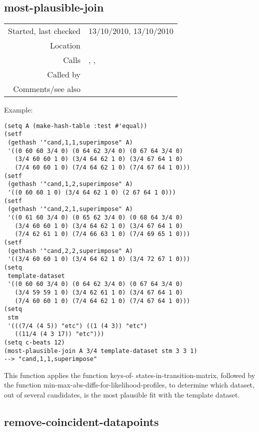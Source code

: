 \subsection*{most-plausible-join}\label{fun:most-plausible-join}

\vspace{0.3cm}
\begin{tabular}{r|p{8cm}}
Started, last checked & 13/10/2010, 13/10/2010 \\
Location & \nameref{sec:generating-beat-MNN-spacing-for-and-back} \\
Calls & \nameref{fun:disp-ht-key}, \nameref{fun:keys-of-states-in-transition-matrix},\newline \nameref{fun:min-max-abs-diffs-for-likelihood-profiles} \\
Called by & \\
Comments/see also &
\end{tabular}

\vspace{0.5cm}
\noindent Example:
\begin{verbatim}
(setq A (make-hash-table :test #'equal))
(setf
 (gethash '"cand,1,1,superimpose" A)
 '((0 60 60 3/4 0) (0 64 62 3/4 0) (0 67 64 3/4 0)
   (3/4 60 60 1 0) (3/4 64 62 1 0) (3/4 67 64 1 0)
   (7/4 60 60 1 0) (7/4 64 62 1 0) (7/4 67 64 1 0)))
(setf
 (gethash '"cand,1,2,superimpose" A)
 '((0 60 60 1 0) (3/4 64 62 1 0) (2 67 64 1 0)))
(setf
 (gethash '"cand,2,1,superimpose" A)
 '((0 61 60 3/4 0) (0 65 62 3/4 0) (0 68 64 3/4 0)
   (3/4 60 60 1 0) (3/4 64 62 1 0) (3/4 67 64 1 0)
   (7/4 62 61 1 0) (7/4 66 63 1 0) (7/4 69 65 1 0)))
(setf
 (gethash '"cand,2,2,superimpose" A)
 '((3/4 60 60 1 0) (3/4 64 62 1 0) (3/4 72 67 1 0)))
(setq
 template-dataset
 '((0 60 60 3/4 0) (0 64 62 3/4 0) (0 67 64 3/4 0)
   (3/4 59 59 1 0) (3/4 62 61 1 0) (3/4 67 64 1 0)
   (7/4 60 60 1 0) (7/4 64 62 1 0) (7/4 67 64 1 0)))
(setq
 stm
 '(((7/4 (4 5)) "etc") ((1 (4 3)) "etc")
   ((11/4 (4 3 17)) "etc")))
(setq c-beats 12)
(most-plausible-join A 3/4 template-dataset stm 3 3 1)
--> "cand,1,1,superimpose"
\end{verbatim}

\noindent This function applies the function keys-of-
states-in-transition-matrix, followed by the function
min-max-abs-diffs-for-likelihood-profiles, to
determine which dataset, out of several candidates, is
the most plausible fit with the template dataset.


\subsection*{remove-coincident-datapoints}\label{fun:remove-coincident-datapoints}

